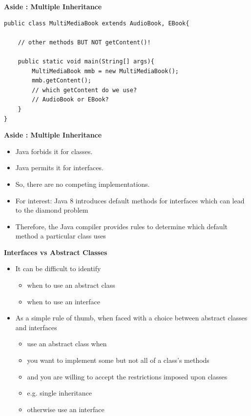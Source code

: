 \documentclass{beamer}
\begin{document}
\begin{frame}[fragile]
\begin{center}
\textbf{Aside : Multiple Inheritance}
\end{center}
\begin{block}{}
\begin{lstlisting}
public class MultiMediaBook extends AudioBook, EBook{
    
    // other methods BUT NOT getContent()!
    
    public static void main(String[] args){
        MultiMediaBook mmb = new MultiMediaBook();
        mmb.getContent();
        // which getContent do we use?
        // AudioBook or EBook?
    }
}
\end{lstlisting}
\end{block}
\end{frame}

\begin{frame}
\begin{center}
\textbf{Aside : Multiple Inheritance}
\end{center}
\begin{itemize}
\item Java forbids it for classes.
\item Java permits it for interfaces.
\item So, there are no competing implementations.
\bigskip
\item For interest:  Java 8 introduces default methods for interfaces which can lead to the diamond problem
\item Therefore, the Java compiler provides rules to determine which default method a particular class uses
\end{itemize}
\end{frame}

\begin{frame}
\begin{center}
\textbf{Interfaces vs Abstract Classes}
\end{center}
\begin{itemize}
\item It can be difficult to identify 
\begin{itemize}
\item when to use an abstract class
\item when to use an interface
\end{itemize}
\item As a simple rule of thumb, when faced with a choice between abstract classes and interfaces
\begin{itemize}
\item use an abstract class when
\item you want to implement some but not all of a class's methods
\item and you are willing to accept the restrictions imposed upon classes
\item e.g. single inheritance
\item otherwise use an interface
\end{itemize}
\end{itemize}
\end{frame}
\end{document}
